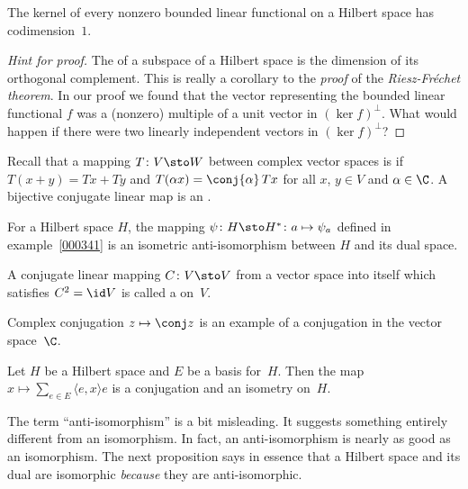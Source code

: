 \begin{cor} The kernel of every nonzero bounded linear functional on a Hilbert space has codimension~$1$.
\end{cor}

\begin{proof}[\emph{Hint for proof}] The
 of a subspace of a Hilbert space is the dimension of its orthogonal complement.  This is really
a corollary to the \emph{proof} of the \emph{Riesz-Fr\'echet theorem}.  In our proof we found that the vector
representing the bounded linear functional $f$ was a (nonzero) multiple of a unit vector in $(\ker f)^\perp$.
What would happen if there were two linearly independent vectors in $(\ker f)^\perp$?   \ns
\end{proof}

\begin{defn} Recall that a mapping $T\colon V \sto W$ between complex vector spaces is
 if $T(x + y) = Tx + Ty$ and $T(\alpha x) = \conj{\alpha}\,Tx$ for all
$x$, $y \in V$ and $\alpha \in \C$. A bijective conjugate linear map is an
.
\end{defn}

\begin{exam}\label{0022057} For a Hilbert space $H$, the mapping
$\psi\colon H \sto H^*\colon a \mapsto \psi_a$ defined in example~\ref{000341} is an
isometric anti-isomorphism between $H$ and its dual space.
\end{exam}

\begin{defn} A conjugate linear mapping $C\colon V \sto V$ from a vector space into itself
which satisfies $C^2 = \id V$ is called a
 on~$V$.
\end{defn}

\begin{exam} Complex conjugation $z \mapsto \conj z$ is an example of a conjugation in the
vector space~$\C$.
\end{exam}

\begin{exam}\label{0022067} Let $H$ be a Hilbert space and $E$ be a basis for~$H$.  Then the
map $x \mapsto \sum_{e \in E}\langle e,x \rangle e$ is a conjugation and an isometry on~$H$.
\end{exam}

The term ``anti-isomorphism'' is a bit misleading. It suggests something entirely
different from an isomorphism.  In fact, an anti-isomorphism is nearly as good as an
isomorphism. The next proposition says in essence that a Hilbert space and its dual are
isomorphic \emph{because} they are anti-isomorphic.

